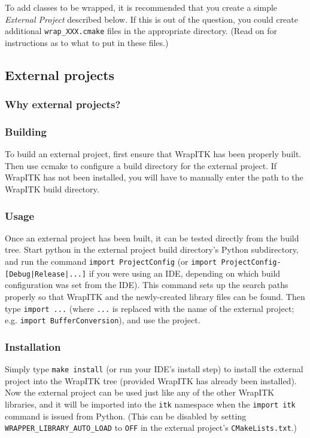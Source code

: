 \documentclass{InsightArticle}
\begin{document}
To add classes to be wrapped, it is recommended that you create a simple
{\em External Project} described below. If this is out of the question, you could
create additional \verb$wrap_XXX.cmake$ files in the appropriate directory. (Read on
for instructions as to what to put in these files.)


  \subsection{External projects}

    \subsubsection{Why external projects?}


    \subsubsection{Building}
To build an external project, first ensure that WrapITK has been properly built.
Then use ccmake to configure a build directory for the external project. If
WrapITK has not been installed, you will have to manually enter the path to the
WrapITK build directory.

    \subsubsection{Usage}
Once an external project has been built, it can be tested directly from the
build tree. Start python in the external project build directory's Python
subdirectory, and run the command \verb$import ProjectConfig$ (or 
\verb$import ProjectConfig-[Debug|Release|...]$ if you were using an IDE, depending on which
build configuration was set from the IDE). This command sets up the search paths
properly so that WrapITK and the newly-created library files can be found. Then
type \verb$import ...$ (where \verb$...$ is replaced with the name of the external
project; e.g. \verb$import BufferConversion$), and use the project.

    \subsubsection{Installation}
Simply type \verb$make install$ (or run your IDE's install step) to install the
external project into the WrapITK tree (provided WrapITK has already been
installed). Now the external project can be used just like any of the other
WrapITK libraries, and it will be imported into the \verb$itk$ namespace when the
\verb$import itk$ command is issued from Python. (This can be disabled by setting
\verb$WRAPPER_LIBRARY_AUTO_LOAD$ to \verb$OFF$ in the external project's \verb$CMakeLists.txt$.)
\end{document}
